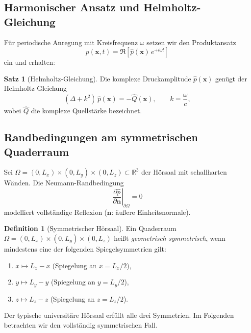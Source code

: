 ﻿\documentclass[12pt, a4paper]{article}
\theoremstyle{definition}
\newtheorem{definition}{Definition}[section]
\newtheorem{satz}{Satz}[section]
\theoremstyle{remark}
\newcommand{\R}{\mathbb{R}}
\newcommand{\Lx}{L_x}
\newcommand{\Ly}{L_y}
\newcommand{\Lz}{L_z}
\newcommand{\pfrac}[2]{\frac{\partial #1}{\partial #2}}
\begin{document}
\subsection{Harmonischer Ansatz und Helmholtz-Gleichung}

Für periodische Anregung mit Kreisfrequenz $\omega$ setzen wir den Produktansatz
\[
  p(\mathbf{x},t) = \Re\!\left[\hat{p}(\mathbf{x})\,e^{+i\omega t}\right]
\]
ein und erhalten:

\begin{satz}[Helmholtz-Gleichung]
Die komplexe Druckamplitude $\hat{p}(\mathbf{x})$ genügt der
Helmholtz-Gleichung
\begin{equation}
  (\Delta + k^2)\,\hat{p}(\mathbf{x}) = -\hat{Q}(\mathbf{x}),
  \qquad k = \frac{\omega}{c},
  \label{eq:helmholtz}
\end{equation}
wobei $\hat{Q}$ die komplexe Quellstärke bezeichnet.
\end{satz}

\subsection{Randbedingungen am symmetrischen Quaderraum}

Sei $\Omega = (0,\Lx) \times (0,\Ly) \times (0,\Lz) \subset \R^3$
der Hörsaal mit schallharten Wänden. Die Neumann-Randbedingung
\begin{equation}
  \left.\pfrac{\hat{p}}{\mathbf{n}}\right|_{\partial\Omega} = 0
  \label{eq:rbc}
\end{equation}
modelliert vollständige Reflexion ($\mathbf{n}$: äußere Einheitsnormale).

\begin{definition}[Symmetrischer Hörsaal]
\label{def:sym_hoersaal}
Ein Quaderraum $\Omega = (0,\Lx)\times(0,\Ly)\times(0,\Lz)$ heißt
\emph{geometrisch symmetrisch}, wenn mindestens eine der folgenden
Spiegelsymmetrien gilt:
\begin{enumerate}[label=(\roman*)]
\item $x \mapsto \Lx - x$ (Spiegelung an $x = \Lx/2$),
\item $y \mapsto \Ly - y$ (Spiegelung an $y = \Ly/2$),
\item $z \mapsto \Lz - z$ (Spiegelung an $z = \Lz/2$).
\end{enumerate}
\end{definition}

Der typische universitäre Hörsaal erfüllt alle drei Symmetrien. Im Folgenden
betrachten wir den vollständig symmetrischen Fall.
\end{document}

